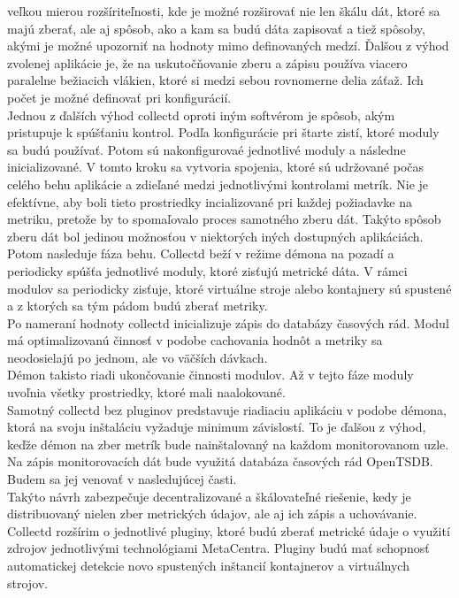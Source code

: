 \documentclass[printed,11pt,twoside,color,cover,table]{fithesis3}
\begin{document}
veľkou mierou rozšíriteľnosti, kde je možné rozširovať nie len škálu dát, ktoré sa majú zberať, ale aj spôsob, ako a kam sa budú dáta zapisovať a tiež spôsoby,
akými je možné upozorniť na hodnoty mimo definovaných medzí. Ďalšou z výhod zvolenej aplikácie je, že na uskutočňovanie zberu a zápisu používa viacero
paralelne bežiacich vlákien, ktoré si medzi sebou rovnomerne delia záťaž. Ich počet je možné definovať pri konfigurácií. 
\\Jednou z ďalších výhod collectd oproti iným softvérom je spôsob, akým pristupuje k spúšťaniu kontrol. Podľa konfigurácie pri štarte zistí, ktoré moduly sa budú používať. Potom sú nakonfigurovaé 
jednotlivé moduly a následne inicializované. V tomto kroku sa vytvoria spojenia, ktoré sú udržované počas celého behu aplikácie a zdieľané medzi jednotlivými kontrolami metrík. Nie je efektívne, aby boli 
tieto prostriedky incializované pri
každej požiadavke na metriku, pretože by to spomaľovalo proces samotného zberu dát. Takýto spôsob zberu dát bol jedinou možnosťou v niektorých iných dostupných aplikáciách.
\\Potom nasleduje fáza behu. Collectd beží v režime démona na pozadí a periodicky spúšťa jednotlivé moduly, ktoré zisťujú metrické dáta. 
V rámci modulov sa periodicky zisťuje, ktoré virtuálne stroje alebo kontajnery sú spustené a z ktorých sa tým pádom budú zberať metriky. 
\\Po nameraní hodnoty collectd inicializuje zápis do databázy časových rád. Modul má optimalizovanú činnosť v podobe cachovania
hodnôt a metriky sa neodosielajú po jednom, ale vo väčších dávkach.
\\Démon takisto riadi ukončovanie činnosti modulov. Až v tejto fáze moduly uvoľnia všetky prostriedky, ktoré mali naalokované.
\\Samotný collectd bez pluginov predstavuje riadiaciu aplikáciu v podobe démona, ktorá na svoju inštaláciu vyžaduje minimum závislostí. To je ďalšou z výhod, keďže 
démon na zber metrík bude nainštalovaný na každom monitorovanom uzle.
\\Na zápis monitorovacích dát bude využitá databáza časových rád OpenTSDB. Budem sa jej venovať v nasledujúcej časti.
\\Takýto návrh zabezpečuje decentralizované a škálovateľné riešenie, kedy je distribuovaný nielen zber metrických údajov, ale aj ich zápis a uchovávanie.
\\Collectd rozšírim o jednotlivé pluginy, ktoré budú zberať metrické údaje o využití zdrojov jednotlivými technológiami MetaCentra. Pluginy budú 
mať schopnosť automatickej detekcie novo spustených inštancií kontajnerov a virtuálnych strojov.
\end{document}
